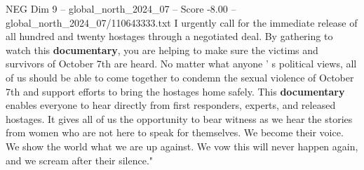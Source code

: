 \begin{textsample}{NEG Dim 9 – global\_north\_2024\_07 – Score -8.00 – global\_north\_2024\_07/110643333.txt}
I urgently call for the immediate release of all hundred and twenty hostages through a negotiated deal.
By gathering to watch this \textbf{documentary}, you are helping to make sure the victims and survivors of October 7th are heard.
No matter what anyone ' s political views, all of us should be able to come together to condemn the sexual violence of October 7th and support efforts to bring the hostages home safely.
This \textbf{documentary} enables everyone to hear directly from first responders, experts, and released hostages.
It gives all of us the opportunity to bear witness as we hear the stories from women who are not here to speak for themselves.
We become their voice.
We show the world what we are up against.
We vow this will never happen again, and we scream after their silence."

\end{textsample}
